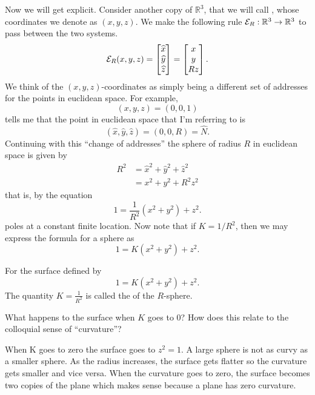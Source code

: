 \documentclass[newpage,hints,handout,12pt,noauthor,nooutcomes]{ximera}
\begin{document}
Now we will get explicit. Consider another copy of $\mathbb{R}^{3}$,
that we will call , whose
coordinates we denote as $( x,y,z) $.  We make the
following rule $\mathcal{E}_R:\mathbb R^3\to\mathbb R^3$ to pass between the two systems.
\[
\mathcal{E}_R(x,y,z) = 
\begin{bmatrix}
\widehat{x}  \\
\widehat{y}  \\
\widehat{z}  
\end{bmatrix}
=
\begin{bmatrix}
  x\\
  y\\
  Rz
\end{bmatrix}.
\]
We think of the $\left( x,y,z\right) $-coordinates as simply being a
different set of addresses for the points in euclidean space. For
example,
\[
\left(x,y,z\right)  =\left(0,0,1\right)
\]
tells me that the point in euclidean space that I'm referring to is%
\[
\left(\hat{x},\hat{y},\hat{z}\right) =\left( 0,0,R\right)= \hat{N}.
\]
Continuing with this ``change of addresses'' the sphere of radius $R$
in euclidean space is given by
\begin{align*}
  R^{2} &=\hat{x}^{2}+\hat{y}^{2}+\hat{z}^{2}\\
  &=x^{2}+y^{2}+R^{2}z^{2}
\end{align*}
that is, by the equation
\[
1=\frac{1}{R^{2}}\left(  x^{2}+y^{2}\right)  +z^{2}. %
\]
poles at a constant finite location.  Now note that if $K=1/R^2$, then
we may express the formula for a sphere as
\[
1=K(x^{2}+y^{2})+z^{2}.
\]


\begin{definition}
  For the surface defined by
  \[
  1=K\left(  x^{2}+y^{2}\right)  +z^{2}. %
  \]
The quantity $K=\frac{1}{R^{2}}$ is called the  of the
$R$-sphere.
\end{definition}

\begin{problem}
  What happens to the surface when $K$ goes to $0$?  How does this relate to the
  colloquial sense of ``curvature''?
  
\begin{freeResponse}
When K goes to zero the surface goes to $z^{2} =1$.  A large sphere is not as curvy as a smaller sphere. As the radius increases, the surface gets flatter so the curvature gets smaller and vice versa.  When the curvature goes to zero, the surface becomes two copies of the plane which makes sense because a plane has zero curvature.  
\end{freeResponse}

\end{problem}
\end{document}
